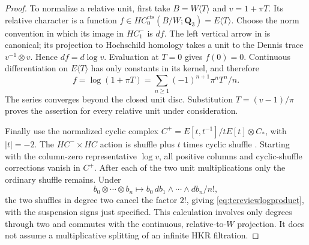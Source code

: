 \documentclass[11pt,a4paper]{article}
\theoremstyle{remark}
\begin{document}
\begin{proof}
To normalize a relative unit, first take $B=W\langle T\rangle$ and
$v=1+\pi T$. Its relative character is a function
$f\in HC_0^{\mathrm{cts}}(B/W;\mathbf Q_3)=E\langle T\rangle$.
Choose the norm convention in which its image in $HC^-_1$ is $df$.
The left vertical arrow in \cite[Theorem~2.12]{AMMN} is canonical;
its projection to Hochschild homology takes a unit to the Dennis trace
$v^{-1}\otimes v$. Hence $df=d\log v$. Evaluation at $T=0$ gives
$f(0)=0$. Continuous differentiation on $E\langle T\rangle$ has
only constants in its kernel, and therefore
\[
 f=\log(1+\pi T)=\sum_{n\ge1}(-1)^{n+1}\pi^nT^n/n.
\]
The series converges beyond the closed unit disc. Substitution
$T=(v-1)/\pi$ proves the assertion for every relative unit under
consideration.

Finally use the normalized cyclic complex
$C^+=E[t,t^{-1}]/tE[t]\otimes C_*$, with $|t|=-2$.
The $HC^-\times HC$ action is shuffle plus $t$ times cyclic shuffle
\cite[Definition~2.1 and Remark~2.2]{BokstedtOttosen}.
Starting with the column-zero representative $\log v$, all positive
columns and cyclic-shuffle corrections vanish in $C^+$. After each
of the two unit multiplications only the ordinary shuffle remains.
Under
\[
 b_0\otimes\cdots\otimes b_n\longmapsto
       b_0\,db_1\wedge\cdots\wedge db_n/n!,
\]
the two shuffles in degree two cancel the factor $2!$, giving
\eqref{eq:tcreviewlogproduct}, with the suspension signs just specified.
This calculation involves only degrees through two and commutes with
the continuous, relative-to-$W$ projection. It does not assume a
multiplicative splitting of an infinite HKR filtration.
\end{proof}
\end{document}
